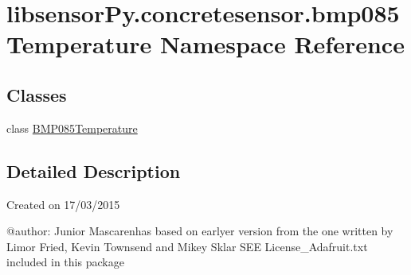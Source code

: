 \hypertarget{namespacelibsensorPy_1_1concretesensor_1_1bmp085Temperature}{}\section{libsensor\+Py.\+concretesensor.\+bmp085\+Temperature Namespace Reference}
\label{namespacelibsensorPy_1_1concretesensor_1_1bmp085Temperature}
\subsection*{Classes}
\begin{DoxyCompactItemize}
\item 
class \hyperlink{classlibsensorPy_1_1concretesensor_1_1bmp085Temperature_1_1BMP085Temperature}{B\+M\+P085\+Temperature}
\end{DoxyCompactItemize}


\subsection{Detailed Description}
\begin{DoxyVerb}Created on 17/03/2015

@author: Junior Mascarenhas
based on earlyer version from
the one written by Limor Fried, Kevin Townsend and Mikey Sklar
SEE License_Adafruit.txt included in this package
\end{DoxyVerb}
 